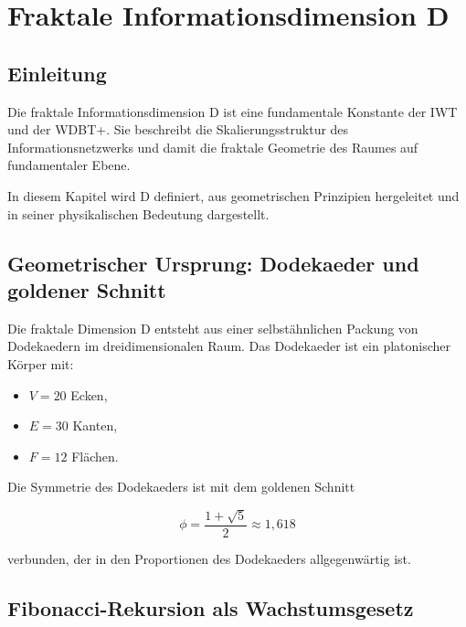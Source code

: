
\chapter{Fraktale Informationsdimension D}
\label{ch:fraktale_dimension}

\section{Einleitung}
\label{sec:d_einleitung}

Die fraktale Informationsdimension D ist eine fundamentale Konstante der IWT und der WDBT+. Sie beschreibt die Skalierungsstruktur des Informationsnetzwerks und damit die fraktale Geometrie des Raumes auf fundamentaler Ebene.

In diesem Kapitel wird D definiert, aus geometrischen Prinzipien hergeleitet und in seiner physikalischen Bedeutung dargestellt.

\section{Geometrischer Ursprung: Dodekaeder und goldener Schnitt}
\label{sec:dodekaeder_golden}

Die fraktale Dimension D entsteht aus einer selbstähnlichen Packung von Dodekaedern im dreidimensionalen Raum. Das Dodekaeder ist ein platonischer Körper mit:

\begin{itemize}
    \item \( V = 20 \) Ecken,
    \item \( E = 30 \) Kanten,
    \item \( F = 12 \) Flächen.
\end{itemize}

Die Symmetrie des Dodekaeders ist mit dem goldenen Schnitt

\[
\phi = \frac{1 + \sqrt{5}}{2} \approx 1,618
\]

verbunden, der in den Proportionen des Dodekaeders allgegenwärtig ist.

\section{Fibonacci-Rekursion als Wachstumsgesetz}
\label{sec:fibonacci_rekursion}

